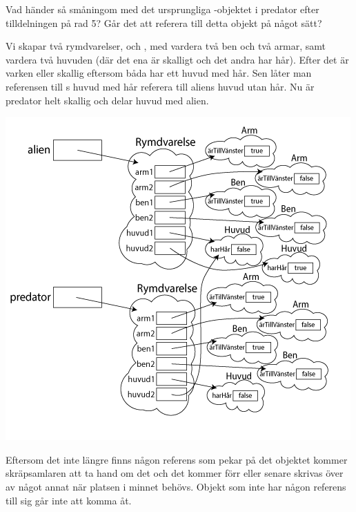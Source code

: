 \Subtask Vad händer så småningom med det ursprungliga -objektet i predator efter tilldelningen på rad 5? Går det att referera till detta objekt på något sätt?

\SOLUTION

\TaskSolved \what

\SubtaskSolved  Vi skapar två rymdvarelser,  och , med vardera två ben och två armar, samt vardera två huvuden (där det ena är skalligt och det andra har hår). Efter det är varken  eller  skallig eftersom båda har ett huvud med hår. Sen låter man referensen till s huvud med hår referera till aliens huvud utan hår. Nu är predator helt skallig och delar huvud med alien.

\includegraphics[scale=0.65]{../img/w06-solutions/2b}

\SubtaskSolved  Eftersom det inte längre finns någon referens som pekar på det objektet kommer skräpsamlaren att ta hand om det och det kommer förr eller senare skrivas över av något annat när platsen i minnet behövs. Objekt som inte har någon referens till sig går inte att komma åt.

\QUESTEND





\QUESTBEGIN

\Task \label{task:Square} \what~

